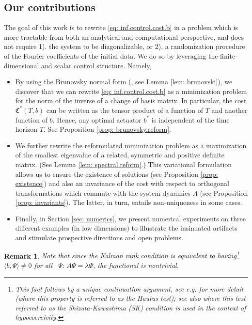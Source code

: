 \documentclass[11pt, a4paper, reqno]{amsart}
\theoremstyle{plain}
\numberwithin{equation}{section}
\newtheorem{remark}{Remark}
\begin{document}
	\subsection{Our contributions}
	
	The goal of this work is to rewrite \eqref{eq: inf.control.cost.b} in a problem which is more tractable from both an analytical and computational perspective, and does not require 1). the system to be diagonalizable, or 2). a randomization procedure of the Fourier coefficients of the initial data. 
	We do so by leveraging the finite-dimensional and scalar control structure. Namely, 
\begin{itemize}
	\item By using the Brunovsky normal form (\citep{brunovsky1970classification}, see Lemma \ref{lem: brunovski}), we discover that we can rewrite \eqref{eq: inf.control.cost.b} as a minimization problem for the norm of the inverse of a change of basis matrix. In particular, the cost $\mathfrak{C}^*(T,b)$ can be written as the tensor product of a function of $T$ and another function of $b$. Hence, any optimal actuator $b^*$ is independent of the time horizon $T$.
	 See Proposition \ref{prop: brunovsky.reform}. 
	\smallskip 
	
	\item We further rewrite the reformulated minimization problem as a maximization of the smallest eigenvalue of a related, symmetric and positive definite matrix. (See Lemma \ref{lem: spectral.reform}.) This variational formulation allows us to ensure the existence of solutions (see Proposition \ref{prop: existence}) and also an invariance of the cost with respect to orthogonal transformations which commute with the system dynamics $A$ (see Proposition \ref{prop: invariants}). The latter, in turn, entails non-uniqueness in some cases. 
	\smallskip
	
	\item Finally, in Section \ref{sec: numerics}, we present numerical experiments on three different examples (in low dimensions) to illustrate the insinuated artifacts and stimulate prospective directions and open problems.
	\end{itemize}
	
	\begin{remark}
	Note that since the Kalman rank condition is equivalent to having\footnote{This fact follows by a unique continuation argument, see e.g. \citep[Section 1.5]{tucsnak2009observation} for more detail (where this property is referred to as the Hautus test); see also \citep[Lem. 1]{beauchard2011large} where this test referred to as the Shizuta-Kawashima (SK) condition is used in the context of hypocoercivity.} $\langle b,\Psi\rangle \neq 0$ for all  $\Psi: \, A\Psi = \lambda \Psi$, the functional is nontrivial. 
	\end{remark}
	
\end{document}

